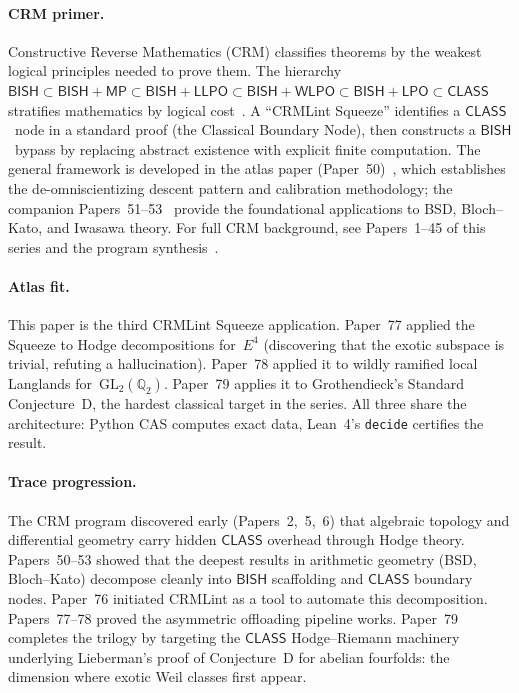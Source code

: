 \documentclass[11pt]{article}
\theoremstyle{plain}
\theoremstyle{definition}
\theoremstyle{remark}
\newcommand{\Q}{\mathbb{Q}}
\newcommand{\GL}{\mathrm{GL}}
\newcommand{\BISH}{\mathsf{BISH}}
\newcommand{\LPO}{\mathsf{LPO}}
\newcommand{\WLPO}{\mathsf{WLPO}}
\newcommand{\LLPO}{\mathsf{LLPO}}
\newcommand{\MP}{\mathsf{MP}}
\newcommand{\CLASS}{\mathsf{CLASS}}
\begin{document}
\paragraph{CRM primer.}
Constructive Reverse Mathematics (CRM) classifies theorems by the weakest
logical principles needed to prove them.  The hierarchy
$\BISH \subset \BISH + \MP \subset \BISH + \LLPO \subset
 \BISH + \WLPO \subset \BISH + \LPO \subset \CLASS$
stratifies mathematics by logical cost~\cite{bridges-richman}.
A ``CRMLint Squeeze'' identifies a $\CLASS$~node in a standard proof
(the Classical Boundary Node), then constructs a $\BISH$~bypass by replacing
abstract existence with explicit finite computation.  The general framework
is developed in the atlas paper (Paper~50)~\cite{paper50}, which establishes
the de-omniscientizing descent pattern and calibration methodology; the
companion Papers~51--53~\cite{paper51,paper52,paper53} provide the
foundational applications to BSD, Bloch--Kato, and Iwasawa theory.  For full
CRM background, see Papers~1--45 of this series and the program
synthesis~\cite{paper67}.

\paragraph{Atlas fit.}
This paper is the third CRMLint Squeeze application.  Paper~77 applied the
Squeeze to Hodge decompositions for~$E^4$ (discovering that the exotic
subspace is trivial, refuting a hallucination).  Paper~78 applied it to
wildly ramified local Langlands for~$\GL_2(\Q_2)$.  Paper~79 applies it
to Grothendieck's Standard Conjecture~D, the hardest classical target in the
series.  All three share the architecture: Python CAS computes exact data,
Lean~4's \texttt{decide} certifies the result.

\paragraph{Trace progression.}
The CRM program discovered early (Papers~2,~5,~6) that algebraic topology and
differential geometry carry hidden $\CLASS$ overhead through Hodge theory.
Papers~50--53 showed that the deepest results in arithmetic geometry
(BSD, Bloch--Kato) decompose cleanly into $\BISH$ scaffolding and
$\CLASS$ boundary nodes.  Paper~76 initiated CRMLint as a tool to automate
this decomposition.  Papers~77--78 proved the asymmetric offloading pipeline
works.  Paper~79 completes the trilogy by targeting the $\CLASS$
Hodge--Riemann machinery underlying Lieberman's proof of Conjecture~D
for abelian fourfolds: the dimension where exotic Weil classes first appear.
\end{document}
